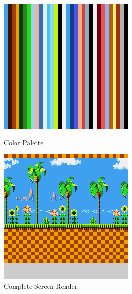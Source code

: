 \documentclass{article}
\begin{document}
\begin{figure}[H]
    \centering
    \begin{minipage}[H]{0.45\linewidth}
        \centering
        \includegraphics[width=\textwidth]{../images/palette.png}
        \caption{Color Palette}
        \label{fig:palette}
    \end{minipage}
    \hfill
    \begin{minipage}[H]{0.45\linewidth}
        \centering
        \includegraphics[width=\textwidth]{../images/screen.png}
        \caption{Complete Screen Render}
        \label{fig:screen}
    \end{minipage}
\end{figure}
\end{document}
